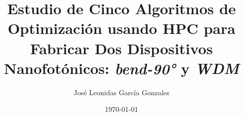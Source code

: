 \documentclass[a4paper, 12pt, oneside]{tesisutec}
\begin{document}
\frontmatter
{}

\title{Estudio de Cinco Algoritmos de Optimización usando HPC para Fabricar Dos Dispositivos Nanofotónicos: \emph{bend-90°} y \emph{WDM}}
\author{José Leonidas García Gonzales}
\date{\today}

\maketitle
{}

%
%
%

\tableofcontents
\newpage
\listoftables
\newpage
\listoffigures


\mainmatter
\pagestyle{fancy}

%
%





%
%


\renewcommand{\bibname}{\large\bf{REFERENCIAS BIBLIOGRÁFICAS}}
\end{document}
